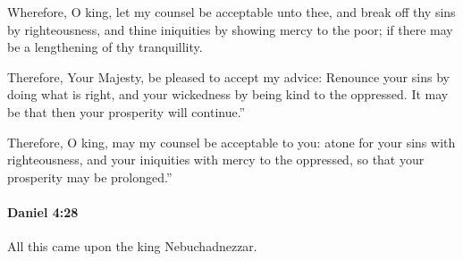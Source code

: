 			\begin{versebox}
					\item[BHS] 
					\item[LXX] 
					\item[ASV] Wherefore, O king, let my counsel be acceptable unto thee, and break off thy sins by righteousness, and thine iniquities by showing mercy to the poor; if there may be a lengthening of thy tranquillity.
					\item[NIV] Therefore, Your Majesty, be pleased to accept my advice: Renounce your sins by doing what is right, and your wickedness by being kind to the oppressed. It may be that then your prosperity will continue.”
					\item[NRSV] Therefore, O king, may my counsel be acceptable to you: atone for your sins with righteousness, and your iniquities with mercy to the oppressed, so that your prosperity may be prolonged.”
			\end{versebox}

		\paragraph{Daniel 4:28} %
			\label{DANIEL-4-28}

			All this came upon the king Nebuchadnezzar.

